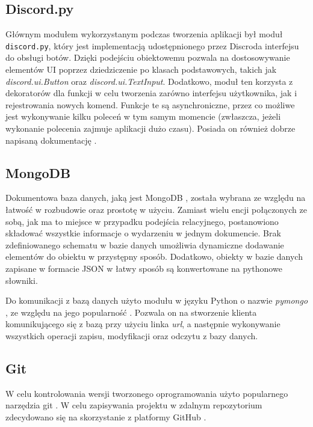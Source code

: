 \documentclass[11pt,a4paper]{article}
\begin{document}
\subsection{Discord.py}

Głównym modułem wykorzystanym podczas tworzenia aplikacji był moduł \texttt{discord.py}, który jest implementacją udostępnionego przez Discroda interfejsu do obsługi botów. Dzięki podejściu obiektowemu pozwala na dostosowywanie elementów UI poprzez dziedziczenie po klasach podstawowych, takich jak \textit{discord.ui.Button} oraz \textit{discord.ui.TextInput}. Dodatkowo, moduł ten korzysta z dekoratorów dla funkcji w celu tworzenia zarówno interfejsu użytkownika, jak i rejestrowania nowych komend. Funkcje te są asynchroniczne, przez co możliwe jest wykonywanie kilku poleceń w tym samym momencie (zwłaszcza, jeżeli wykonanie polecenia zajmuje aplikacji dużo czasu). Posiada on również dobrze napisaną dokumentację \cite{DiscordPyDocumentation}.


\subsection{MongoDB}

Dokumentowa baza danych, jaką jest MongoDB \cite{MongoDB}, została wybrana ze względu na łatwość w rozbudowie oraz prostotę w użyciu. Zamiast wielu encji połączonych ze sobą, jak ma to miejsce w przypadku podejścia relacyjnego, postanowiono składować wszystkie informacje o wydarzeniu w jednym dokumencie. Brak zdefiniowanego schematu w bazie danych umożliwia dynamiczne dodawanie elementów do obiektu w przystępny sposób. Dodatkowo, obiekty w bazie danych zapisane w formacie JSON w łatwy sposób są konwertowane na pythonowe słowniki.

Do komunikacji z bazą danych użyto modułu w języku Python o nazwie \textit{pymongo} \cite{PyMongo}, ze względu na jego popularność \cite{PyMongoPopularity}. Pozwala on na stworzenie klienta komunikującego się z bazą przy użyciu linka \textit{url}, a następnie wykonywanie wszystkich operacji zapisu, modyfikacji oraz odczytu z bazy danych.

\subsection{Git}

W celu kontrolowania wersji tworzonego oprogramowania użyto popularnego narzędzia git \cite{BestVersionControllTool}. W celu zapisywania projektu w zdalnym repozytorium zdecydowano się na skorzystanie z platformy GitHub \cite{GitHub}.
\end{document}
